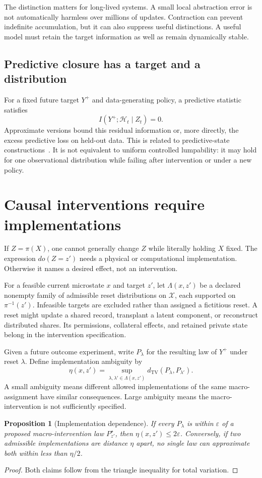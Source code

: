 \documentclass[11pt,letterpaper]{article}
\theoremstyle{plain}
\newtheorem{proposition}{Proposition}[section]
\theoremstyle{definition}
\theoremstyle{remark}
\newcommand{\TV}{d_{\mathrm{TV}}}
\newcommand{\X}{\mathcal X}
\newcommand{\Hist}{\mathcal H}
\begin{document}
The distinction matters for long-lived systems. A small local abstraction error is not automatically harmless over millions of updates. Contraction can prevent indefinite accumulation, but it can also suppress useful distinctions. A useful model must retain the target information as well as remain dynamically stable.

\subsection{Predictive closure has a target and a distribution}
For a fixed future target $Y^+$ and data-generating policy, a predictive statistic satisfies
\[
I(Y^+;\Hist_t\mid Z_t)=0.
\]
Approximate versions bound this residual information or, more directly, the excess predictive loss on held-out data. This is related to predictive-state constructions~\cite{shalizi}. It is not equivalent to uniform controlled lumpability: it may hold for one observational distribution while failing after intervention or under a new policy.

\section{Causal interventions require implementations}\label{sec:causal}
If $Z=\pi(X)$, one cannot generally change $Z$ while literally holding $X$ fixed. The expression $do(Z=z')$ needs a physical or computational implementation. Otherwise it names a desired effect, not an intervention.

For a feasible current microstate $x$ and target $z'$, let $\Lambda(x,z')$ be a declared nonempty family of admissible reset distributions on $\X$, each supported on $\pi^{-1}(z')$. Infeasible targets are excluded rather than assigned a fictitious reset. A reset might update a shared record, transplant a latent component, or reconstruct distributed shares. Its permissions, collateral effects, and retained private state belong in the intervention specification.

Given a future outcome experiment, write $P_\lambda$ for the resulting law of $Y^+$ under reset $\lambda$. Define implementation ambiguity by
\[
\eta(x,z')=\sup_{\lambda,\lambda'\in\Lambda(x,z')}
\TV(P_\lambda,P_{\lambda'}).
\]
A small ambiguity means different allowed implementations of the same macro-assignment have similar consequences. Large ambiguity means the macro-intervention is not sufficiently specified.

\begin{proposition}[Implementation dependence]\label{prop:lift}
If every $P_\lambda$ is within $\varepsilon$ of a proposed macro-intervention law $P^\star_{z'}$, then $\eta(x,z')\leq2\varepsilon$. Conversely, if two admissible implementations are distance $\eta$ apart, no single law can approximate both within less than $\eta/2$.
\end{proposition}
\begin{proof}
Both claims follow from the triangle inequality for total variation.
\end{proof}
\end{document}
